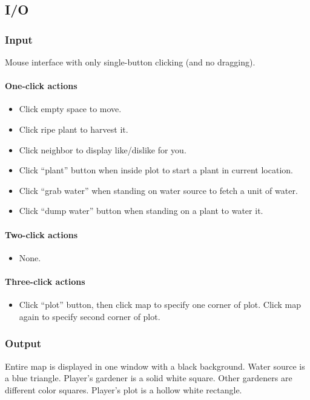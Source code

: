 \documentclass[12pt]{article}
\begin{document}
\subsection{I/O}

\subsubsection{Input}
Mouse interface with only single-button clicking (and no dragging).  

\paragraph{One-click actions}
\begin{itemize}
\item Click empty space to move.  
\item Click ripe plant to harvest it.
\item Click neighbor to display like/dislike for you.
\item Click ``plant'' button when inside plot to start a plant in current location.
\item Click ``grab water'' when standing on water source to fetch a unit of water.
\item Click ``dump water'' button when standing on a plant to water it.
\end{itemize}

\paragraph{Two-click actions}
\begin{itemize}
\item None.
\end{itemize}

\paragraph{Three-click actions}
\begin{itemize}
\item Click ``plot'' button, then click map to specify one corner of plot.  Click map again to specify second corner of plot. 
\end{itemize}

\subsubsection{Output}

Entire map is displayed in one window with a black background.
Water source is a blue triangle.
Player's gardener is a solid white square.  
Other gardeners are different color squares.
Player's plot is a hollow white rectangle.
\end{document}

